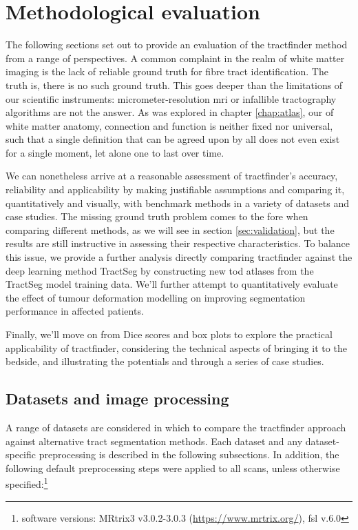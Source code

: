 \chapter{Methodological evaluation}

The following sections set out to provide an evaluation of the tractfinder method from a range of perspectives.
A common complaint in the realm of white matter imaging is the lack of reliable ground truth for fibre tract identification.
The truth is, there is no such ground truth.
This goes deeper than the limitations of our scientific instruments: micrometer-resolution \gls{mri} or infallible tractography algorithms are not the answer.
As was explored in chapter \ref{chap:atlas}, our  of white matter anatomy, connection and function is neither fixed nor universal, such that a single definition that can be agreed upon by all does not even exist for a single moment, let alone one to last over time.

We can nonetheless arrive at a reasonable assessment of tractfinder's accuracy, reliability and applicability by making justifiable assumptions and comparing it, quantitatively and visually, with benchmark methods in a variety of datasets and case studies.
The missing ground truth problem comes to the fore when comparing different methods, as we will see in section \ref{sec:validation}, but the results are still instructive in assessing their respective characteristics.
To balance this issue, we provide a further analysis directly comparing tractfinder against the deep learning method TractSeg by constructing new \gls{tod} atlases from the TractSeg model training data.
We'll further attempt to quantitatively evaluate the effect of tumour deformation modelling on improving segmentation performance in affected patients.

Finally, we'll move on from Dice scores and box plots to explore the practical applicability of tractfinder, considering the technical aspects of bringing it to the bedside, and illustrating the potentials and  through a series of case studies.

\section{Datasets and image processing}
\label{sec:data}

A range of datasets are considered in which to compare the tractfinder approach against alternative tract segmentation methods.
Each dataset and any dataset-specific preprocessing is described in the following subsections.
In addition, the following default preprocessing steps were applied to all scans, unless otherwise specified:\footnote[2]{software versions: MRtrix3 v3.0.2-3.0.3 (\url{https://www.mrtrix.org/}), \gls{fsl} v.6.0}

